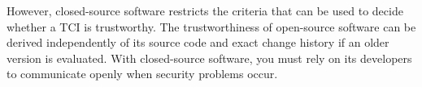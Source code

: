 However, closed-source software restricts the criteria that can be used to decide whether a TCI is trustworthy.
The trustworthiness of open-source software can be derived independently of its source code and exact change history if an older version is evaluated.
With closed-source software, you must rely on its developers to communicate openly when security problems occur.










